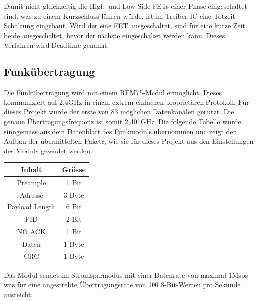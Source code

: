 Damit nicht gleichzeitig die High- und Low-Side FETs einer Phase eingeschaltet sind, was zu einem Kurzschluss führen würde, ist im Treiber IC eine Totzeit-Schaltung eingebaut. Wird der eine FET ausgeschaltet, sind für eine kurze Zeit beide ausgeschaltet, bevor der nächste eingeschaltet werden kann. Dieses Verfahren wird Deadtime genannt.

\subsection{Funkübertragung}
Die Funkübertragung wird mit einem RFM75-Modul ermöglicht. Dieses kommuniziert auf 2.4GHz in einem extrem einfachen proprietären Protokoll. Für dieses Projekt wurde der erste von 83 möglichen Datenkanälen genutzt. Die genaue Übertragungsfrequenz ist somit 2,401GHz. Die folgende Tabelle wurde sinngemäss aus dem Datenblatt des Funkmoduls übernommen und zeigt den Aufbau der übermittelten Pakete, wie sie für dieses Projekt aus den Einstellungen des Moduls gesendet werden.
\begin{center}
	\begin{tabularx}{0.3\textwidth}{c|c}
		Inhalt & Grösse \\ \hline
		Preample& 1 Bit \\ \hline
		Adresse &3 Byte \\ \hline
		Payload Length& 6 Bit \\ \hline
		PID &2 Bit \\ \hline
		NO ACK & 1 Bit \\ \hline
		Daten & 1 Byte \\ \hline
		CRC & 1 Byte \\
	\end{tabularx}
\end{center}

Das Modul sendet im Stromsparmodus mit einer Datenrate von maximal 1Msps was für eine angestrebte Übertragungsrate von 100 8-Bit-Werten pro Sekunde ausreicht.
\label{tGl_RF}
